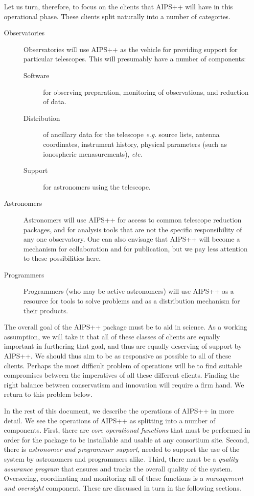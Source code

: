 Let us turn, therefore, to focus on the clients that AIPS++ will have in
this operational phase. These clients split naturally into a number of
categories.

\begin{description}
\item[Observatories] Observatories will use AIPS++ as the vehicle for
providing support for particular telescopes. This will presumably have
a number of components:
\begin{description}
\item[Software] for observing preparation, monitoring of observations,
and reduction of data.
\item[Distribution] of ancillary data for the telescope {\em e.g.}
source lists, antenna coordinates, instrument history, physical 
parameters (such as ionospheric menasurements), {\em etc.}
\item[Support] for astronomers using the telescope.
\end{description}
\item[Astronomers] Astronomers will use AIPS++ for access to
common telescope reduction packages, and for analysis tools that are
not the specific responsibility of any one observatory. One can also
envisage that AIPS++ will become a mechanism for collaboration and for
publication, but we pay less attention to these possibilities here.
\item[Programmers] Programmers (who may be active astronomers) will use AIPS++
as a resource for tools to solve problems and as a distribution mechanism for
their products.
\end{description}

The overall goal of the AIPS++ package must be to aid in science. As a
working assumption, we will take it that all of these classes of
clients are equally important in furthering that goal, and thus are
equally deserving of support by AIPS++.  We should thus aim to be as
responsive as possible to all of these clients. Perhaps the most
difficult problem of operations will be to find suitable compromises
between the imperatives of all these different clients. Finding the
right balance between conservatism and innovation will require a firm
hand. We return to this problem below.

In the rest of this document, we describe the operations of AIPS++ in
more detail. We see the operations of AIPS++ as splitting into a
number of components. First, there are {\em core operational
functions} that must be performed in order for the package to be
installable and usable at any consortium site. Second, there is {\em
astronomer and programmer support}, needed to support the use of the
system by astronomers and programmers alike. Third, there must be a
{\em quality assurance program} that ensures and tracks the overall
quality of the system.  Overseeing, coordinating and monitoring all of
these functions is a {\em management and oversight} component. These
are discussed in turn in the following sections.

